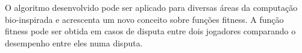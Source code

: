 O algoritmo desenvolvido pode ser aplicado para diversas áreas da computação bio-inspirada e acrescenta um novo conceito sobre funções fitness. A função fitness pode ser obtida em casos de disputa entre dois jogadores comparando o desempenho entre eles numa disputa.